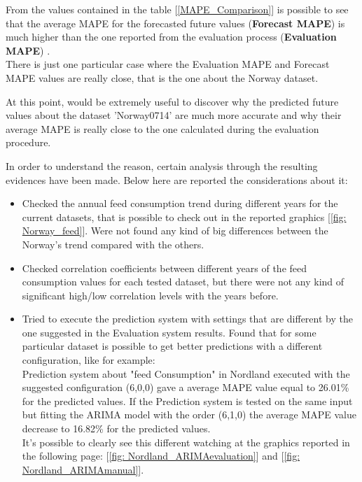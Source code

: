 From the values contained in the table [\ref{MAPE_Comparison}] is possible to see that the average MAPE for the forecasted future values (\textbf{Forecast MAPE}) is much higher than the one reported from the evaluation process (\textbf{Evaluation MAPE}) . \\
There is just one particular case where the Evaluation MAPE and Forecast MAPE values are really close, that is the one about the Norway dataset.

At this point, would be extremely useful to discover why the predicted future values about the dataset 'Norway0714' are much more accurate and why their average MAPE is really close to the one calculated during the evaluation procedure.

In order to understand the reason, certain analysis through the resulting evidences have been made. Below here are reported the considerations about it:
\vspace{-5mm}
\begin{itemize}
 \item Checked the annual feed consumption trend during different years for the current datasets, that is possible to check out in the reported graphics [\ref{fig: Norway_feed}]. Were not found any kind of big differences between the Norway's trend compared with the others.
 \item Checked correlation coefficients between different years of the feed consumption values for each tested dataset, but there were not any kind of significant high/low correlation levels with the years before.
 \item Tried to execute the prediction system with settings that are different by the one suggested in the Evaluation system results. Found that for some particular dataset is possible to get better predictions with a different configuration, like for example: \\
 Prediction system about "feed Consumption" in Nordland executed with the suggested configuration (6,0,0) gave a average MAPE value equal to 26.01\% for the predicted values. If the Prediction system is tested on the same input but fitting the ARIMA model with the order (6,1,0) the average MAPE value decrease to 16.82\% for the predicted values. \\
 It's possible to clearly see this different watching at the graphics reported in the following page: [\ref{fig: Nordland_ARIMAevaluation}] and [\ref{fig: Nordland_ARIMAmanual}].
\end{itemize}

